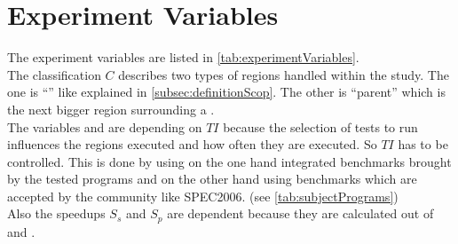 \section{Experiment Variables}
The experiment variables are listed in \autoref{tab:experimentVariables}.\\
The classification \(C\) describes two types of regions handled within the study.
The one is \enquote{\scop} like explained in \autoref{subsec:definitionScop}.
The other is \enquote{parent} which is the next bigger region surrounding a \scop.\\
The variables \dyncovs and \dyncovp are depending on \(TI\) because the selection of tests to run influences the regions executed and how often they are executed.
So \(TI\) has to be controlled.
This is done by using on the one hand integrated benchmarks brought by the tested programs and on the other hand using benchmarks which are accepted by the community like SPEC2006. (see \autoref{tab:subjectPrograms})\\
Also the speedups \(S_s\) and \(S_p\) are dependent because they are calculated out of \dyncovs and \dyncovp.
